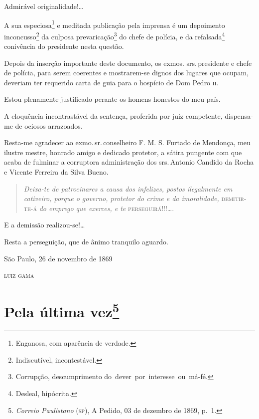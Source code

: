 Admirável originalidade!\ldots{}

A sua especiosa\footnote{Enganosa, com aparência de verdade.} e
meditada publicação pela imprensa é um depoimento inconcusso\footnote{
  Indiscutível, incontestável.} da culposa prevaricação\footnote{
  Corrupção, descumprimento do~dever~por~interesse~ou~má-fé.} do chefe
de polícia, e da refalsada\footnote{Desleal, hipócrita.} conivência do
presidente nesta questão.

Depois da inserção importante deste documento, os exmos. srs.\,presidente
e chefe de polícia, para serem coerentes e mostrarem-se dignos dos
lugares que ocupam, deveriam ter requerido carta de guia para o hospício
de Dom Pedro \textsc{ii}.

Estou plenamente justificado perante os homens honestos do meu país.

A eloquência incontrastável da sentença, proferida por juiz competente,
dispensa-me de ociosos arrazoados.

Resta-me agradecer ao exmo.\,sr.\,conselheiro F. M. S. Furtado de
Mendonça, meu ilustre mestre, honrado amigo e dedicado protetor, a
sátira pungente com que acaba de fulminar a corruptora administração dos
srs.\,Antonio Candido da Rocha e Vicente Ferreira da Silva Bueno.

\begin{quote}
\emph{Deixa-te de patrocinares a causa dos infelizes, postos
ilegalmente em cativeiro, porque o governo, protetor do crime e da
imoralidade,} \textsc{demitir-te-á} \emph{do emprego que exerces, e te}
\textsc{perseguirá}!!!\ldots{}.
\end{quote}

E a demissão realizou-se!\ldots{}

Resta a perseguição, que de ânimo tranquilo aguardo.

\begin{flushright}
São Paulo, 26 de novembro de 1869

\textsc{luiz gama}
\end{flushright}

\chapter{Pela última vez\footnote{\emph{Correio Paulistano} (\textsc{sp}), A
  Pedido, 03 de dezembro de 1869, p.~1.}}

